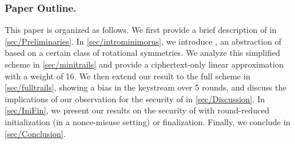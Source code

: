 \subsubsection*{Paper Outline.}
This paper is organized as follows.
We first provide a brief description of \morus in \autoref{sec/Preliminaries}.
In \autoref{sec/introminimorus}, we introduce \minimorus, an abstraction of \morus based on a certain class of rotational symmetries.
We analyze this simplified scheme in \autoref{sec/minitrails} and provide a ciphertext-only linear approximation with a weight of 16.
We then extend our result to the full scheme in \autoref{sec/fulltrails}, showing a bias in the keystream over 5 rounds,
and discuss the implications of our observation for the security of \morus in \autoref{sec/Discussion}.
In \autoref{sec/IniFin}, we present our results on the security of \morus with round-reduced initialization (in a nonce-misuse setting) or finalization.
Finally, we conclude in \autoref{sec/Conclusion}.
